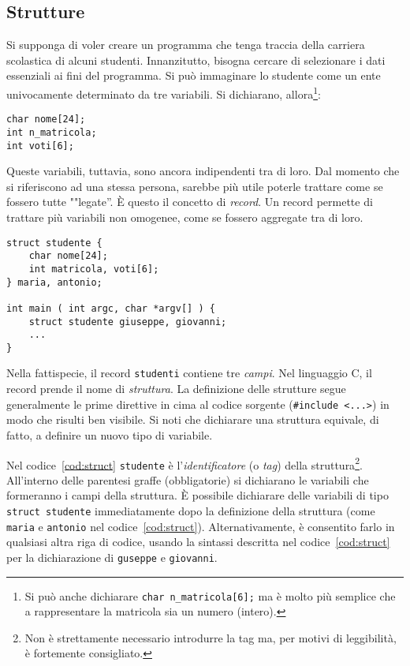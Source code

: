 		\subsection{Strutture}
		\label{subsec:record}
Si supponga di voler creare un programma che tenga traccia della carriera scolastica di alcuni studenti. Innanzitutto, bisogna cercare di selezionare i dati essenziali ai fini del programma. Si può immaginare lo studente come un ente univocamente determinato da tre variabili. Si dichiarano, allora\footnote{Si può anche dichiarare \lstinline!char n_matricola[6];! ma è molto più semplice che a rappresentare la matricola sia un numero (intero).}:
\begin{lstlisting}
char nome[24];
int n_matricola;
int voti[6];
\end{lstlisting}
Queste variabili, tuttavia, sono ancora indipendenti tra di loro. Dal momento che si riferiscono ad una stessa persona, sarebbe più utile poterle trattare come se fossero tutte ""legate''. È questo il concetto di \emph{record}. Un record permette di trattare più variabili non omogenee, come se fossero aggregate tra di loro.
\begin{lstlisting}[caption={[\em Struttura e variabili] {\em Definizione di una struttura e dichiarazione di variabili.}}, label={cod:struct}]
struct studente {
	char nome[24];
	int matricola, voti[6];
} maria, antonio;

int main ( int argc, char *argv[] ) {
	struct studente giuseppe, giovanni;
	...
}
\end{lstlisting}
Nella fattispecie, il record \lstinline!studenti! contiene tre \emph{campi}. Nel linguaggio C, il record prende il nome di \emph{struttura}. La definizione delle strutture segue generalmente le prime direttive in cima al codice sorgente (\lstinline!#include <...>!) in modo che risulti ben visibile. Si noti che dichiarare una struttura equivale, di fatto, a definire un nuovo tipo di variabile.

Nel codice~\vref{cod:struct} \lstinline!studente! è l'\emph{identificatore} (o \emph{tag}) della struttura\footnote{Non è strettamente necessario introdurre la tag ma, per motivi di leggibilità, è fortemente consigliato.}. All'interno delle parentesi graffe (obbligatorie) si dichiarano le variabili che formeranno i campi della struttura. \`E possibile dichiarare delle variabili di tipo \lstinline!struct studente! immediatamente dopo la definizione della struttura (come \lstinline!maria! e \lstinline!antonio! nel codice~\vref{cod:struct}). Alternativamente, è consentito farlo in qualsiasi altra riga di codice, usando la sintassi descritta nel codice~\vref{cod:struct} per la dichiarazione di \lstinline!guseppe! e \lstinline!giovanni!.


